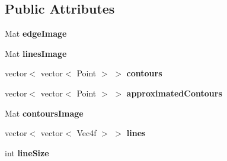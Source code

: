 \subsection*{Public Attributes}
\begin{DoxyCompactItemize}
\item 
\hypertarget{classContoursAndLines_a0407956646772fbf4bf17fac631f1a28}{
Mat {\bfseries edgeImage}}
\label{classContoursAndLines_a0407956646772fbf4bf17fac631f1a28}

\item 
\hypertarget{classContoursAndLines_adf0046eb0ff3b4fb27ee30ce73471d53}{
Mat {\bfseries linesImage}}
\label{classContoursAndLines_adf0046eb0ff3b4fb27ee30ce73471d53}

\item 
\hypertarget{classContoursAndLines_aaa800d7a9f280fbfe086f3916650d039}{
vector$<$ vector$<$ Point $>$ $>$ {\bfseries contours}}
\label{classContoursAndLines_aaa800d7a9f280fbfe086f3916650d039}

\item 
\hypertarget{classContoursAndLines_a4abcbda23b9f8c411dbfedcbfdd38b2f}{
vector$<$ vector$<$ Point $>$ $>$ {\bfseries approximatedContours}}
\label{classContoursAndLines_a4abcbda23b9f8c411dbfedcbfdd38b2f}

\item 
\hypertarget{classContoursAndLines_a5a48086141ba799f5f495f78edafa3b1}{
Mat {\bfseries contoursImage}}
\label{classContoursAndLines_a5a48086141ba799f5f495f78edafa3b1}

\item 
\hypertarget{classContoursAndLines_a27b0e699b483619e46b908191acbccb9}{
vector$<$ vector$<$ Vec4f $>$ $>$ {\bfseries lines}}
\label{classContoursAndLines_a27b0e699b483619e46b908191acbccb9}

\item 
\hypertarget{classContoursAndLines_a00fd4f32d61d96edd1a1d1b153929e6a}{
int {\bfseries lineSize}}
\label{classContoursAndLines_a00fd4f32d61d96edd1a1d1b153929e6a}

\end{DoxyCompactItemize}


